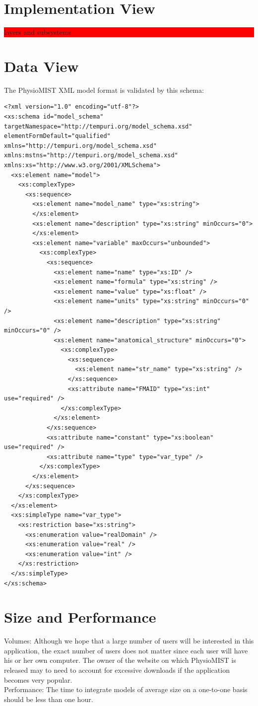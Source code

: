 \documentclass{article}
\newcommand{\todo}[1]{\colorbox{red}{\begin{minipage}{\textwidth}{#1}\end{minipage}}}
\begin{document}
\section{Implementation View}
\todo{layers and subsystems}

\section{Data View}
The PhysioMIST XML model format is validated by this schema:

\begin{verbatim}
<?xml version="1.0" encoding="utf-8"?>
<xs:schema id="model_schema" targetNamespace="http://tempuri.org/model_schema.xsd"
elementFormDefault="qualified" xmlns="http://tempuri.org/model_schema.xsd"
xmlns:mstns="http://tempuri.org/model_schema.xsd"
xmlns:xs="http://www.w3.org/2001/XMLSchema">
  <xs:element name="model">
    <xs:complexType>
      <xs:sequence>
        <xs:element name="model_name" type="xs:string">
        </xs:element>
        <xs:element name="description" type="xs:string" minOccurs="0">
        </xs:element>
        <xs:element name="variable" maxOccurs="unbounded">
          <xs:complexType>
            <xs:sequence>
              <xs:element name="name" type="xs:ID" />
              <xs:element name="formula" type="xs:string" />
              <xs:element name="value" type="xs:float" />
              <xs:element name="units" type="xs:string" minOccurs="0" />
              <xs:element name="description" type="xs:string" minOccurs="0" />
              <xs:element name="anatomical_structure" minOccurs="0">
                <xs:complexType>
                  <xs:sequence>
                    <xs:element name="str_name" type="xs:string" />
                  </xs:sequence>
                  <xs:attribute name="FMAID" type="xs:int" use="required" />
                </xs:complexType>
              </xs:element>
            </xs:sequence>
            <xs:attribute name="constant" type="xs:boolean" use="required" />
            <xs:attribute name="type" type="var_type" />
          </xs:complexType>
        </xs:element>
      </xs:sequence>
    </xs:complexType>
  </xs:element>
  <xs:simpleType name="var_type">
    <xs:restriction base="xs:string">
      <xs:enumeration value="realDomain" />
      <xs:enumeration value="real" />
      <xs:enumeration value="int" />
    </xs:restriction>
  </xs:simpleType>
</xs:schema>
\end{verbatim}

\section{Size and Performance}
Volumes:
\newline
Although we hope that a large number of users will be interested in this application, the exact number of users does not matter since each user will have his or her own computer.  The owner of the website on which PhysioMIST is released may to need to account for excessive downloads if the application becomes very popular.\\
Performance:
\newline
The time to integrate models of average size on a one-to-one basis should be less than one hour.
\end{document}
